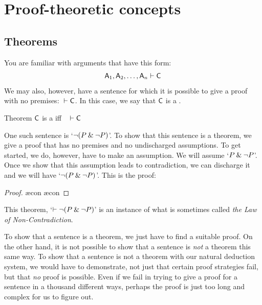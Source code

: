 

\chapter{Proof-theoretic concepts}\label{s:ProofTheoreticConcepts}

\section{Theorems}\label{s:theorems}

You are familiar with arguments that have this form:
$$\mathsf{A}_1, \mathsf{A}_2, \ldots, \mathsf{A}_n \vdash \mathsf{C}$$
We may also, however, have a sentence for which it is possible to give a proof with no premises: ${} \vdash \mathsf{C}$. In this case, we say that $\mathsf{C}$ is a .

\begin{factboxy}{Theorem}\label{def:syntactic_tautology_in_sl}
$\mathsf{C}$ is a  iff ~ $\vdash \mathsf{C}$
\end{factboxy}

One such sentence is `${\neg} (P \mathbin{\&} {\neg} P)$'. To show that this sentence is a theorem, we give a proof that has no premises and no undischarged assumptions. To get started, we do, however, have to make an assumption. We will assume `$P \mathbin{\&} {\neg} P$'. Once we show that this assumption leads to contradiction, we can discharge it and we will have `${\neg} (P \mathbin{\&} {\neg} P)$'. This is the proof:
	\begin{proof}
		\open
			\ae{con}
			\ae{con}
		\close
	\end{proof}
This theorem, `$\vdash {\neg} (P \mathbin{\&} {\neg} P)$' is an instance of what is sometimes called \emph{the Law of Non-Contradiction}.

To show that a sentence is a theorem, we just have to find a suitable proof. On the other hand, it is not possible to show that a sentence is \emph{not} a theorem this same way. To show that a sentence is not a theorem with our natural deduction system, we would have to demonstrate, not just that certain proof strategies fail, but that \emph{no} proof is possible. Even if we fail in trying to give a proof for a sentence in a thousand different ways, perhaps the proof is just too long and complex for us to figure out. 


